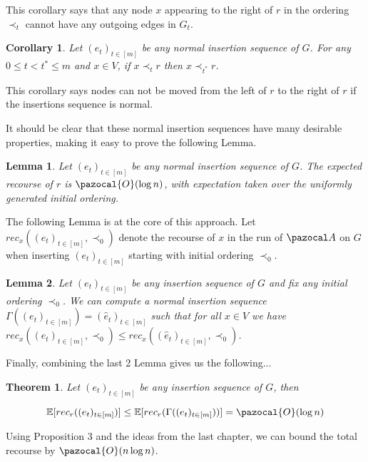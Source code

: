 \documentclass{article}
\newtheorem{theorem}{Theorem}
\newtheorem{lemma}{Lemma}
\newtheorem{corollary}{Corollary}
\begin{document}
This corollary says that any node $x$ appearing to the right of $r$ in the ordering $\prec_t$ cannot have any outgoing edges in $G_t$.

\begin{corollary}
Let $(e_t)_{t \in [m]}$ be any normal insertion sequence of $G$. For any $0 \leq t < t^* \leq m$ and $x \in V$, if $x \prec_t r$ then $x \prec_{t^*} r$.
\end{corollary}

This corollary says nodes can not be moved from the left of $r$ to the right of $r$ if the insertions sequence is normal.

It should be clear that these normal insertion sequences have many desirable properties, making it easy to prove the following Lemma.

\begin{lemma}
Let $(e_t)_{t \in [m]}$ be any normal insertion sequence of $G$. The expected recourse of $r$ is $\pazocal{O}(\log n)$, with expectation taken over the uniformly generated initial ordering.
\end{lemma}

The following Lemma is at the core of this approach. Let $rec_x((e_t)_{t \in [m]}, \prec_0)$ denote the recourse of $x$ in the run of $\pazocal A$ on $G$ when inserting $(e_t)_{t \in [m]}$ starting with initial ordering $\prec_0$.

\begin{lemma}
Let $(e_t)_{t \in [m]}$ be any insertion sequence of $G$ and fix any initial ordering $\prec_0$. We can compute a normal insertion sequence $\Gamma((e_t)_{t \in [m]}) = (\hat{e}_t)_{t \in [m]}$ such that for all $x \in V$ we have $rec_x((e_t)_{t \in [m]}, \prec_0) \leq rec_x((\hat{e}_t)_{t \in [m]}, \prec_0)$.
\end{lemma}

Finally, combining the last 2 Lemma gives us the following...

\begin{theorem}
Let $(e_t)_{t \in [m]}$ be any insertion sequence of $G$, then

\[ \mathbb{E}[ rec_r((e_t)_{t \in [m]})] \leq \mathbb{E}[ rec_r(\Gamma((e_t)_{t \in [m]}))] = \pazocal{O}(\log n) \]
\end{theorem}

Using Proposition 3 and the ideas from the last chapter, we can bound the total recourse by $\pazocal{O}(n \log n)$.
\end{document}
